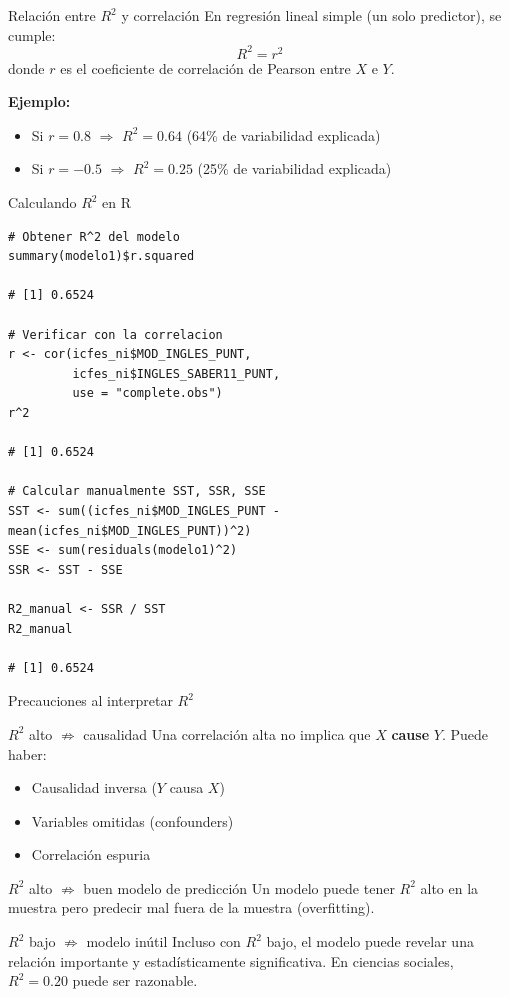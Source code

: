 \documentclass[aspectratio=169, 11pt]{beamer}
\begin{document}
\begin{frame}{Relaci\'on entre $R^2$ y correlaci\'on}
En regresi\'on lineal simple (un solo predictor), se cumple:
\[
R^2 = r^2
\]
donde $r$ es el coeficiente de correlaci\'on de Pearson entre $X$ e $Y$.

\vspace{0.3cm}
\textbf{Ejemplo:}
\begin{itemize}
  \item Si $r = 0.8$ $\Rightarrow$ $R^2 = 0.64$ (64\% de variabilidad explicada)
  \item Si $r = -0.5$ $\Rightarrow$ $R^2 = 0.25$ (25\% de variabilidad explicada)
\end{itemize}
\end{frame}

\begin{frame}[fragile]{Calculando $R^2$ en R}
\begin{lstlisting}[basicstyle=\ttfamily\scriptsize,aboveskip=0pt,belowskip=0pt]
# Obtener R^2 del modelo
summary(modelo1)$r.squared

# [1] 0.6524

# Verificar con la correlacion
r <- cor(icfes_ni$MOD_INGLES_PUNT,
         icfes_ni$INGLES_SABER11_PUNT,
         use = "complete.obs")
r^2

# [1] 0.6524

# Calcular manualmente SST, SSR, SSE
SST <- sum((icfes_ni$MOD_INGLES_PUNT - mean(icfes_ni$MOD_INGLES_PUNT))^2)
SSE <- sum(residuals(modelo1)^2)
SSR <- SST - SSE

R2_manual <- SSR / SST
R2_manual

# [1] 0.6524
\end{lstlisting}
\end{frame}

\begin{frame}{Precauciones al interpretar $R^2$}
\begin{alertblock}{$R^2$ alto $\not\Rightarrow$ causalidad}
Una correlación alta no implica que $X$ \textbf{cause} $Y$. Puede haber:
\begin{itemize}
  \item Causalidad inversa ($Y$ causa $X$)
  \item Variables omitidas (confounders)
  \item Correlación espuria
\end{itemize}
\end{alertblock}

\begin{alertblock}{$R^2$ alto $\not\Rightarrow$ buen modelo de predicción}
Un modelo puede tener $R^2$ alto en la muestra pero predecir mal fuera de la muestra (overfitting).
\end{alertblock}

\begin{alertblock}{$R^2$ bajo $\not\Rightarrow$ modelo inútil}
Incluso con $R^2$ bajo, el modelo puede revelar una relación importante y estadísticamente significativa. En ciencias sociales, $R^2 = 0.20$ puede ser razonable.
\end{alertblock}
\end{frame}
\end{document}
